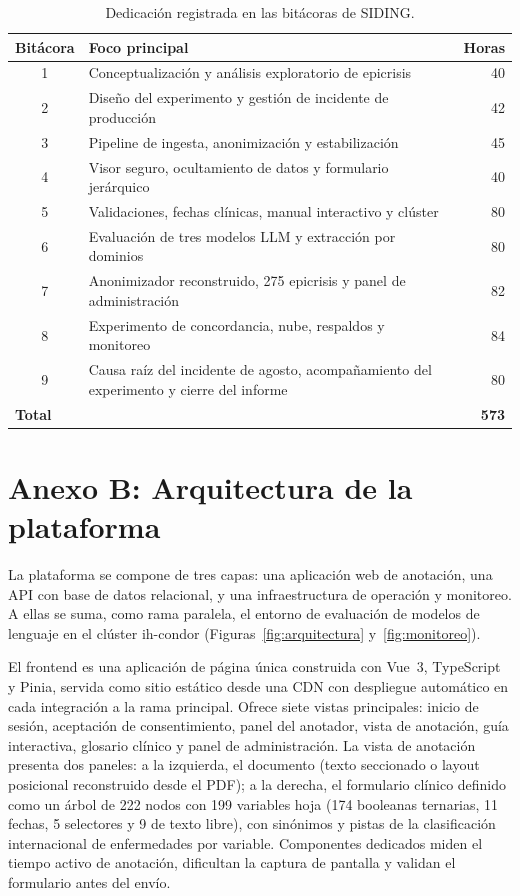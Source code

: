 \documentclass[12pt,letterpaper]{article}
\begin{document}
\begin{table}[h]
\centering
\begin{tabular}{c >{\raggedright\arraybackslash}p{9.5cm} r}
\toprule
\textbf{Bitácora} & \textbf{Foco principal} & \textbf{Horas} \\
\midrule
1 & Conceptualización y análisis exploratorio de epicrisis & 40 \\
2 & Diseño del experimento y gestión de incidente de producción & 42 \\
3 & Pipeline de ingesta, anonimización y estabilización & 45 \\
4 & Visor seguro, ocultamiento de datos y formulario jerárquico & 40 \\
5 & Validaciones, fechas clínicas, manual interactivo y clúster & 80 \\
6 & Evaluación de tres modelos LLM y extracción por dominios & 80 \\
7 & Anonimizador reconstruido, 275 epicrisis y panel de administración & 82 \\
8 & Experimento de concordancia, nube, respaldos y monitoreo & 84 \\
9 & Causa raíz del incidente de agosto, acompañamiento del experimento y cierre del informe & 80 \\
\midrule
\multicolumn{2}{l}{\textbf{Total}} & \textbf{573} \\
\bottomrule
\end{tabular}
\caption{Dedicación registrada en las bitácoras de SIDING.}
\end{table}

\section*{Anexo B: Arquitectura de la plataforma}

La plataforma se compone de tres capas: una aplicación web de anotación, una API con base de datos relacional, y una infraestructura de operación y monitoreo. A ellas se suma, como rama paralela, el entorno de evaluación de modelos de lenguaje en el clúster ih-condor (Figuras~\ref{fig:arquitectura} y~\ref{fig:monitoreo}).

El frontend es una aplicación de página única construida con Vue~3, TypeScript y Pinia, servida como sitio estático desde una CDN con despliegue automático en cada integración a la rama principal. Ofrece siete vistas principales: inicio de sesión, aceptación de consentimiento, panel del anotador, vista de anotación, guía interactiva, glosario clínico y panel de administración. La vista de anotación presenta dos paneles: a la izquierda, el documento (texto seccionado o layout posicional reconstruido desde el PDF); a la derecha, el formulario clínico definido como un árbol de 222 nodos con 199 variables hoja (174 booleanas ternarias, 11 fechas, 5 selectores y 9 de texto libre), con sinónimos y pistas de la clasificación internacional de enfermedades por variable. Componentes dedicados miden el tiempo activo de anotación, dificultan la captura de pantalla y validan el formulario antes del envío.
\end{document}

